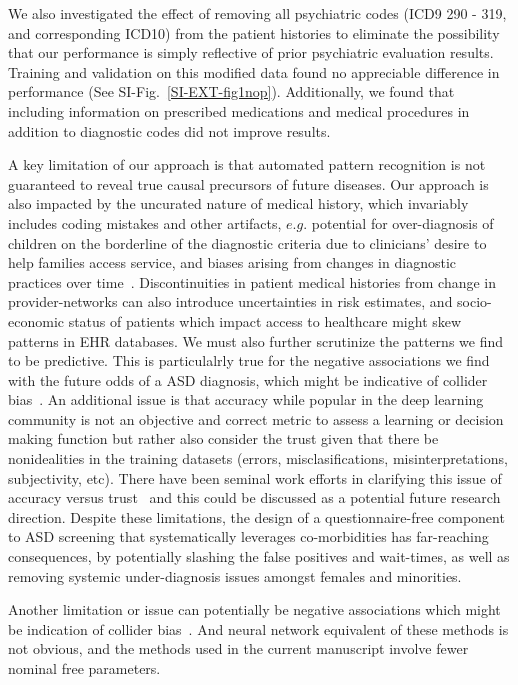 \documentclass[onecolumn,10pt]{IEEEtran}
\begin{document}
We also investigated the effect of removing all psychiatric codes (ICD9 290 - 319, and corresponding ICD10) from the patient histories to eliminate the possibility that our performance is simply reflective of prior psychiatric evaluation results. Training and validation on this modified data found  no appreciable difference in performance (See SI-Fig.~\ref{SI-EXT-fig1nop}).
Additionally, we found that including information on prescribed medications and medical procedures in addition to diagnostic codes did not improve results.

A key  limitation of our approach is that automated pattern recognition  is not guaranteed to reveal true causal precursors of future diseases. Our approach is also impacted by the uncurated nature of medical history, which invariably includes coding mistakes and other artifacts, $e.g.$   potential for  over-diagnosis of  children on the borderline of the diagnostic criteria due to clinicians' desire to help families access service, and biases arising from changes in diagnostic practices over time~\cite{10.1001/jamapsychiatry.2019.1956}. Discontinuities in patient medical histories from change in provider-networks  can also introduce  uncertainties  in risk estimates, and socio-economic status of patients which impact access to healthcare  might skew patterns in EHR databases. We must also further scrutinize the patterns we find to be predictive. This is particulalrly true for the negative associations we find with the future odds of a ASD diagnosis, which might be indicative of collider bias~\cite{berkson1946limitations}.
An additional issue is that accuracy while popular in the deep
learning community is not an objective and correct metric to assess a learning or decision making function but rather also consider the trust given that there be nonidealities in the
training datasets (errors, misclasifications, misinterpretations, subjectivity, etc). There have been seminal work efforts in clarifying this issue of accuracy versus trust~\cite{cheng2020there} and this could be discussed as a potential future research direction. Despite these limitations, the design of a questionnaire-free component to ASD screening  that systematically leverages co-morbidities  has far-reaching consequences, by potentially slashing the false positives and wait-times, as well as removing systemic under-diagnosis issues amongst females and minorities. 





Another limitation or issue can potentially be negative associations which might be indication of collider bias~\cite{berkson1946limitations}.
And neural network equivalent of these methods is not obvious, and the
methods used in the current manuscript involve fewer nominal free parameters.
\end{document}

